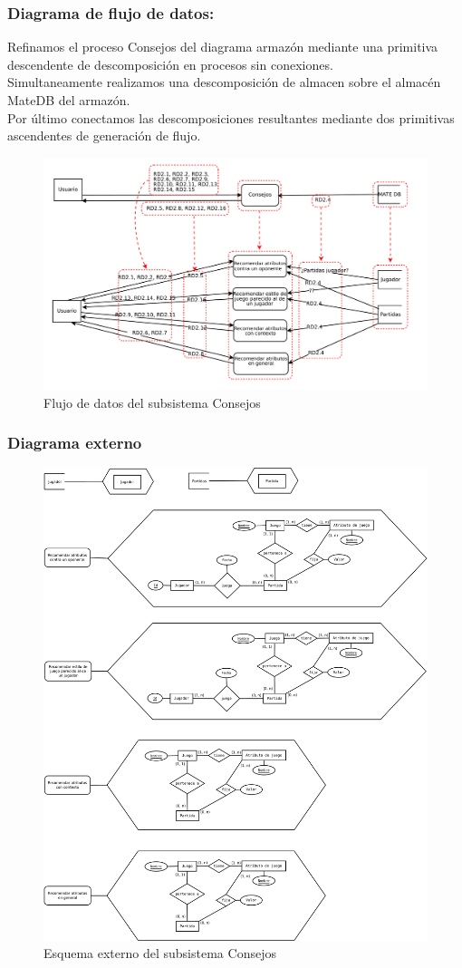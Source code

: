 \subsubsection{Diagrama de flujo de datos:}

Refinamos el proceso Consejos del diagrama armazón mediante
una primitiva descendente de descomposición en procesos sin conexiones.\\
Simultaneamente realizamos una descomposición de almacen sobre el
almacén MateDB del armazón.\\
Por último conectamos las descomposiciones resultantes mediante dos
primitivas ascendentes de generación de flujo.\\ 
 
\begin{figure}[H]
\centering
\includegraphics[width=0.7\linewidth]{../Diagramas/pdf/RefinamientoConsejos.pdf}
\caption{Flujo de datos del subsistema Consejos}
\end{figure}


\subsubsection{Diagrama externo}

\begin{figure}[H]
\centering
\includegraphics[width=0.7\linewidth]{../Diagramas/pdf/ExternoConsejos.pdf}
\caption{Esquema externo del subsistema Consejos}
\end{figure}


